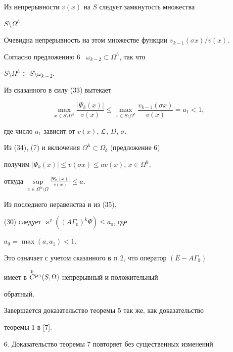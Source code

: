 Из непрерывности $v(x)$ на $S$ следует замкнутость множества 


$S\setminus\Omega^h$. 


Очевидна непрерывность на этом множестве функции $v_{k-1}(\sigma 


x)/v(x)$. 


Согласно предложению 6 \ $\omega_{k-2}\subset\Omega^h$, так что 


$S\setminus\Omega^h\subset S\setminus\omega_{k-2}$. 


Из сказанного в силу (33) вытекает


\begin{equation} 


\max_{x\in S\setminus\Omega^h} 


\frac{|\Psi_k(x)|}{v(x)}\le\max_{x\in S\setminus\Omega^h} 


\frac{v_{k-1}(\sigma x)}{v(x)}=a_1<1, 


\end{equation} 


где число $a_1$ зависит от $v(x)$, $\cal L$, $D$, $\sigma$. 


 


Из (34), (7) и включения $\Omega^h\subset\Omega_\delta$ (предложение 6) 


получим $|\Psi_k(x)|\le v(\sigma x)\le a v(x)$, $x\in\Omega^h$, 


откуда $\sup\limits_{x\in \Omega^h\setminus\Omega} 


\frac{|\Psi_k(x)|}{v(x)}\le a$. 


Из последнего неравенства и из (35), 


(30) следует $\varkappa^v((A\Gamma_0)^k\Psi)\le a_0$, где 


$a_0=\max(a,a_1)<1$. 


Это означает с учетом сказанного в п.\,2, что оператор $(E-A\Gamma_0)$ 


имеет в $\overset{0}{C}{}^{\mu\gamma}(S,\Omega)$ непрерывный и положительный 


обратный. 


 


Завершается доказательство теоремы 5 так же, как доказательство 


теоремы 1 в [7]. 


\medskip 


 


6. Доказательство теоремы 7 повторяет без существенных изменений 


